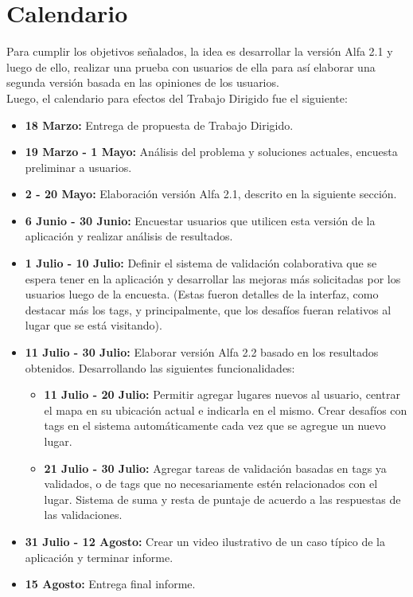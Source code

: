 \documentclass[10pt,letterpaper]{article}
\begin{document}
\newpage
\section{Calendario}

Para cumplir los objetivos señalados, la idea es desarrollar la versión Alfa 2.1 y luego de ello, realizar una prueba con usuarios de ella para así elaborar una segunda versión basada en las opiniones de los usuarios.\\

Luego, el calendario para efectos del Trabajo Dirigido fue el siguiente:\\

\begin{itemize}
\item \textbf{18 Marzo:} Entrega de propuesta de Trabajo Dirigido.
\item \textbf{19 Marzo - 1 Mayo:} Análisis del problema y soluciones actuales, encuesta preliminar a usuarios.
\item \textbf{2 - 20 Mayo:} Elaboración versión Alfa 2.1, descrito en la siguiente sección.
\item \textbf{6 Junio - 30 Junio:} Encuestar usuarios que utilicen esta versión de la aplicación y realizar análisis de resultados.
\item \textbf{1 Julio - 10 Julio:} Definir el sistema de validación colaborativa que se espera tener en la aplicación y desarrollar las mejoras más solicitadas por los usuarios luego de la encuesta. (Estas fueron detalles de la interfaz, como destacar más los tags, y principalmente, que los desafíos fueran relativos al lugar que se está visitando).
 \item \textbf{11 Julio - 30 Julio:} Elaborar versión Alfa 2.2 basado en los resultados obtenidos. Desarrollando las siguientes funcionalidades:
  \begin{itemize}
  \item \textbf{11 Julio - 20 Julio:} Permitir agregar lugares nuevos al usuario, centrar el mapa en su ubicación actual e indicarla en el mismo. Crear desafíos con tags en el sistema automáticamente cada vez que se agregue un nuevo lugar.
  \item \textbf{21 Julio - 30 Julio:} Agregar tareas de validación basadas en tags ya validados, o de tags que no necesariamente estén relacionados con el lugar. Sistema de suma y resta de puntaje de acuerdo a las respuestas de las validaciones.
  \end{itemize}
 \item \textbf{31 Julio - 12 Agosto:} Crear un video ilustrativo de un caso típico de la aplicación y terminar informe. 
 \item \textbf{15 Agosto:} Entrega final informe. 
\end{itemize}
\end{document}
